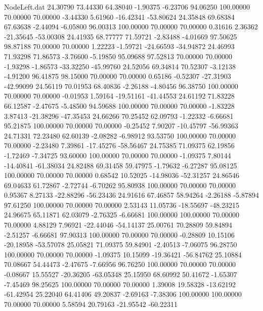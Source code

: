 \begin{filecontents}{NodeLeft.dat}
  24.30790   73.44330   64.38040    -1.90375   -6.23706   94.06250  100.00000   70.00000   70.00000   -3.44330    5.61960  -16.42341  -53.80624
  24.35848   69.68384   67.63638    -2.44094   -6.05800   96.00313  100.00000   70.00000   70.00000    0.31616    2.36362  -21.35645  -53.00308
  24.41935   68.77777   71.59721    -2.83488   -4.01669   97.50625   98.87188   70.00000   70.00000    1.22223   -1.59721  -24.66593  -34.94872
  24.46993   71.93298   71.86573    -3.76600   -5.19850   95.09688   97.52813   70.00000   70.00000   -1.93298   -1.86573  -33.32250  -45.99760
  24.52056   69.34814   70.52307    -3.12138   -4.91200   96.41875   98.15000   70.00000   70.00000    0.65186   -0.52307  -27.31903  -42.99099
  24.56119   70.01953   68.40836    -2.26188   -4.80456   96.38750  100.00000   70.00000   70.00000   -0.01953    1.59164  -19.51161  -41.44553
  24.61192   71.83228   66.12587    -2.47675   -5.48500   94.59688  100.00000   70.00000   70.00000   -1.83228    3.87413  -21.38296  -47.35453
  24.66266   70.25452   62.09793    -1.22332   -6.66681   95.21875  100.00000   70.00000   70.00000   -0.25452    7.90207  -10.45797  -56.99363
  24.71331   72.23480   62.60139    -2.08282   -6.98912   93.53750  100.00000   70.00000   70.00000   -2.23480    7.39861  -17.45276  -58.56467
  24.75385   71.09375   62.19856    -1.72469   -7.34725   93.60000  100.00000   70.00000   70.00000   -1.09375    7.80144  -14.40841  -61.38034
  24.82488   69.31458   59.47975    -1.79632   -6.27287   95.08125  100.00000   70.00000   70.00000    0.68542   10.52025  -14.98036  -52.31257
  24.86546   69.04633   61.72867    -2.72744   -6.70262   95.80938  100.00000   70.00000   70.00000    0.95367    8.27133  -22.88296  -56.23436
  24.91616   67.46857   58.94264    -2.26188   -5.87894   97.61250  100.00000   70.00000   70.00000    2.53143   11.05736  -18.55697  -48.23215
  24.96675   65.11871   62.03079    -2.76325   -6.66681  100.00000  100.00000   70.00000   70.00000    4.88129    7.96921  -22.44046  -54.14137
  25.00761   70.28809   59.84894    -2.51257   -6.66681   97.90313  100.00000   70.00000   70.00000   -0.28809   10.15106  -20.18958  -53.57078
  25.05821   71.09375   59.84901    -2.40513   -7.06075   96.28750  100.00000   70.00000   70.00000   -1.09375   10.15099  -19.36421  -56.84762
  25.10884   70.08667   54.44473    -2.47675   -7.66956   96.76250  100.00000   70.00000   70.00000   -0.08667   15.55527  -20.36205  -63.05348
  25.15950   68.60992   50.41672    -1.65307   -7.45469   98.25625  100.00000   70.00000   70.00000    1.39008   19.58328  -13.62192  -61.42954
  25.22040   64.41406   49.20837    -2.69163   -7.38306  100.00000  100.00000   70.00000   70.00000    5.58594   20.79163  -21.95542  -60.22311

\end{filecontents}

